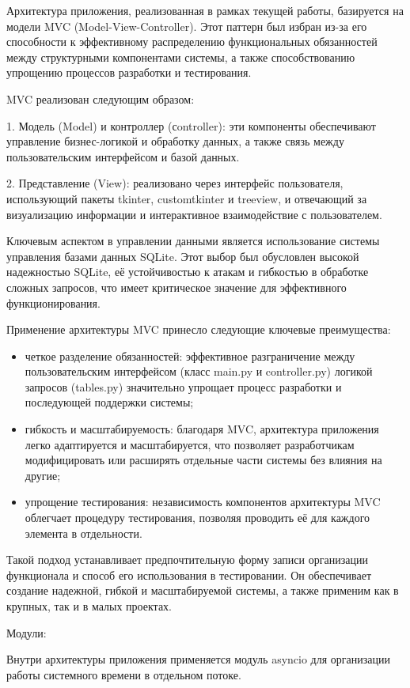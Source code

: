 Архитектура приложения, реализованная в рамках текущей работы, базируется на модели MVC (Model-View-Controller). Этот паттерн был избран из-за его способности к эффективному распределению функциональных обязанностей между структурными компонентами системы, а также способствованию упрощению процессов разработки и тестирования.

MVC реализован следующим образом:

1. Модель (Model) и контроллер (сontroller): эти компоненты обеспечивают управление бизнес-логикой и обработку данных, а также связь между пользовательским интерфейсом и базой данных.

2. Представление (View): реализовано через интерфейс пользователя, использующий пакеты tkinter, customtkinter и treeview, и отвечающий за визуализацию информации и интерактивное взаимодействие с пользователем.

Ключевым аспектом в управлении данными является использование системы управления базами данных SQLite. Этот выбор был обусловлен высокой надежностью SQLite, её устойчивостью к атакам и гибкостью в обработке сложных запросов, что имеет критическое значение для эффективного функционирования.

Применение архитектуры MVC принесло следующие ключевые преимущества:

\begin{itemize}
	\item четкое разделение обязанностей: эффективное разграничение между пользовательским интерфейсом (класс main.py и controller.py) логикой запросов (tables.py) значительно упрощает процесс разработки и последующей поддержки системы;
	\item гибкость и масштабируемость: благодаря MVC, архитектура приложения легко адаптируется и масштабируется, что позволяет разработчикам
	модифицировать или расширять отдельные части системы без влияния на другие;
	\item упрощение тестирования: независимость компонентов архитектуры MVC облегчает процедуру тестирования, позволяя проводить её для каждого элемента в отдельности.
\end{itemize}

Такой подход устанавливает предпочтительную форму записи организации функционала и способ его использования в тестировании. Он обеспечивает создание надежной, гибкой и масштабируемой системы, а также применим как в крупных, так и в малых проектах.

Модули:

Внутри архитектуры приложения применяется модуль asyncio для организации работы системного времени в отдельном потоке.

